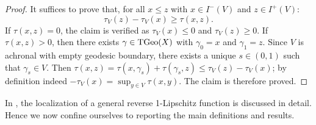 \documentclass[a4paper,10pt]{article}
\newcommand{\TGeo}{{\rm TGeo}}
\theoremstyle{plain}
\theoremstyle{definition}
\numberwithin{equation}{section}
\begin{document}
\begin{proof} It suffices to prove that,
for all  $x\leq z$ with $x \in I^-(V)$ and 
$z \in I^+(V)$:
\[
\tau_{V}(z) - \tau_{V}(x) \geq \tau(x,z).
\]
If $\tau(x,z) = 0$, the claim is verified as 
$\tau_{V}(x) \leq 0$ and $\tau_V(z)\geq 0$. 
If $\tau(x,z) > 0$, then there exists  $\gamma\in \TGeo(X)$ with $\gamma_0=x$ and $\gamma_1 = z$. Since $V$  is achronal with empty geodesic  boundary, 
there exists a unique  $s \in (0,1)$ such that 
$\gamma_s \in V$. 
Then 
$\tau(x,z) = \tau(x,\gamma_s) + \tau(\gamma_s,z)
\leq \tau_V(z) - \tau_V(x)$;
by definition indeed
$- \tau_V(x) = \sup_{y\in V} \tau(x,y)$. 
The claim is therefore proved.
\end{proof}





In \cite[Section 6]{cavalletti2024sharpisoperimetrictypeinequalitylorentzian}, the localization of a general reverse 1-Lipschitz function is discussed in detail. 
Hence we now confine ourselves to reporting the main definitions and results. 
\end{document}
